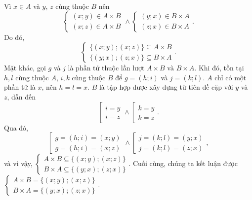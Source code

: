 Vì $x \in A$ và $y$, $z$ cùng thuộc $B$ nên \begin{equation*}
   \begin{cases}
      (x; y) \in A \times B \\
      (x; z) \in A \times B 
   \end{cases} \land \begin{cases}
      (y; x) \in B \times A \\
      (z; x) \in B \times A
   \end{cases}.
\end{equation*}
Do đó, \begin{equation*}
   \begin{cases}
      \{(x; y); (x; z)\} \subseteq A \times B \\
      \{(y; x); (z; x)\} \subseteq B \times A
   \end{cases}.
\end{equation*}
Mặt khác, gọi $g$ và $j$ là phần tử thuộc lần lượt $A \times B$ và $B \times A$. Khi đó, tồn tại $h, l$ cùng thuộc $A$, $i, k$ cùng thuộc $B$ để $g = (h; i)$ và $j = (k; l)$. $A$ chỉ có một phần tử là $x$, nên $h = l = x$. $B$ là tập hợp được xây dựng từ tiên đề cặp với $y$ và $z$, dẫn đến
\begin{equation*}
   \left[\begin{aligned}
      i = y \\
      i = z
   \end{aligned}\right. \land \left[\begin{aligned}
      k = y \\
      k = z
   \end{aligned}\right..
\end{equation*} 
Qua đó, \begin{equation*}
   \left[\begin{aligned}
      g = (h; i) = (x; y) \\
      g = (h; i) = (x; z)
   \end{aligned}\right. \land \left[\begin{aligned}
      j = (k; l) = (y; x) \\
      j = (k; l) = (z; x)
   \end{aligned}\right.,
\end{equation*}
và vì vậy, $\begin{cases}
   A \times B \subseteq \{(x; y); (x; z)\} \\
   B \times A \subseteq \{(y; x); (z; x)\}
\end{cases}$. Cuối cùng, chúng ta kết luận được $\begin{cases}
   A \times B = \{(x; y); (x; z)\} \\
   B \times A = \{(y; x); (z; x)\}
\end{cases}$.

